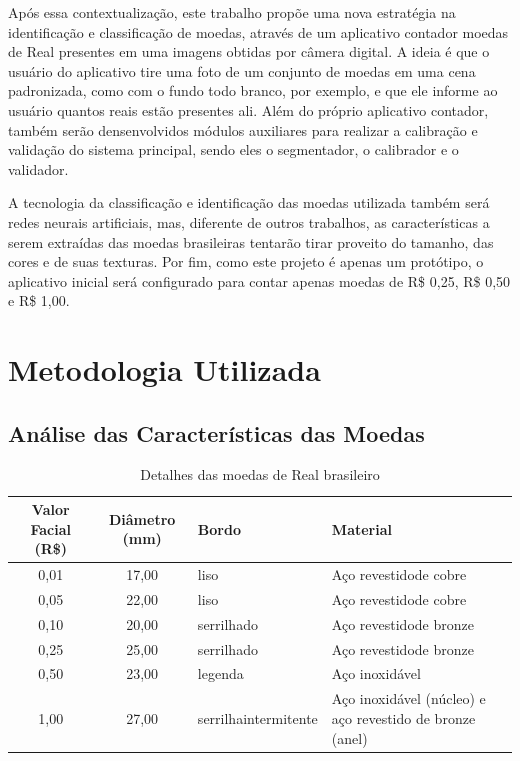 \documentclass[10pt,journal,compsoc]{IEEEtran}
\begin{document}
Após essa contextualização, este trabalho propõe uma nova estratégia na identificação e classificação de moedas, através de um aplicativo contador moedas de Real presentes em uma imagens obtidas por câmera digital. A ideia é que o usuário do aplicativo tire uma foto de um conjunto de moedas em uma cena padronizada, como com o fundo todo branco, por exemplo, e que ele informe ao usuário quantos reais estão presentes ali. Além do próprio aplicativo contador, também serão densenvolvidos módulos auxiliares para realizar a calibração e validação do sistema principal, sendo eles o segmentador, o calibrador e o validador.

A tecnologia da classificação e identificação das moedas utilizada também será redes neurais artificiais, mas, diferente de outros trabalhos, as características a serem extraídas das moedas brasileiras tentarão tirar proveito do tamanho, das cores e de suas texturas. Por fim, como este projeto é apenas um protótipo, o aplicativo inicial será configurado para contar apenas moedas de R\$ 0,25, R\$  0,50 e R\$ 1,00.

\section{Metodologia Utilizada}
\label{sec:metologia-utilizada}

\subsection{Análise das Características das Moedas}
\label{sec:metodologia-moedas}

\begin{table}[]
\centering
\caption{Detalhes das moedas de Real brasileiro}
\label{tab:moedas}
\begin{tabular}{@{}ccll@{}}
\toprule
\textbf{Valor Facial (R\$)} & \textbf{Diâmetro (mm)} & \multicolumn{1}{l}{\textbf{Bordo}} & \multicolumn{1}{l}{\textbf{Material}}                    \\ \midrule
0,01                        & 17,00                  & liso                               & Aço revestidode cobre                                    \\
0,05                        & 22,00                  & liso                               & Aço revestidode cobre                                    \\
0,10                        & 20,00                  & serrilhado                         & Aço revestidode bronze                                   \\
0,25                        & 25,00                  & serrilhado                         & Aço revestidode bronze                                   \\
0,50                        & 23,00                  & legenda                            & Aço inoxidável                                           \\
1,00                        & 27,00                  & serrilhaintermitente               & Aço inoxidável (núcleo) e aço revestido de bronze (anel) \\ \bottomrule
\end{tabular}
\end{table}
\end{document}
